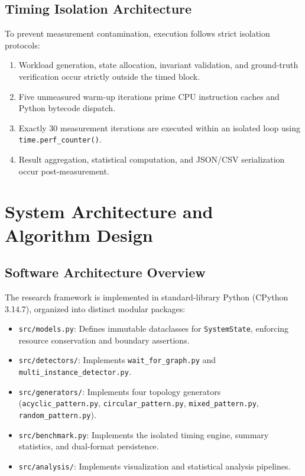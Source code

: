 \documentclass[11pt,a4paper]{article}
\begin{document}
\subsection{Timing Isolation Architecture}
To prevent measurement contamination, execution follows strict isolation protocols:
\begin{enumerate}
    \item Workload generation, state allocation, invariant validation, and ground-truth verification occur strictly outside the timed block.
    \item Five unmeasured warm-up iterations prime CPU instruction caches and Python bytecode dispatch.
    \item Exactly 30 measurement iterations are executed within an isolated loop using \texttt{time.perf\_counter()}.
    \item Result aggregation, statistical computation, and JSON/CSV serialization occur post-measurement.
\end{enumerate}

\section{System Architecture and Algorithm Design}

\subsection{Software Architecture Overview}
The research framework is implemented in standard-library Python (CPython 3.14.7), organized into distinct modular packages:
\begin{itemize}
    \item \texttt{src/models.py}: Defines immutable dataclasses for \texttt{SystemState}, enforcing resource conservation and boundary assertions.
    \item \texttt{src/detectors/}: Implements \texttt{wait\_for\_graph.py} and \texttt{multi\_instance\_detector.py}.
    \item \texttt{src/generators/}: Implements four topology generators (\texttt{acyclic\_pattern.py}, \texttt{circular\_pattern.py}, \texttt{mixed\_pattern.py}, \texttt{random\_pattern.py}).
    \item \texttt{src/benchmark.py}: Implements the isolated timing engine, summary statistics, and dual-format persistence.
    \item \texttt{src/analysis/}: Implements visualization and statistical analysis pipelines.
\end{itemize}
\end{document}
